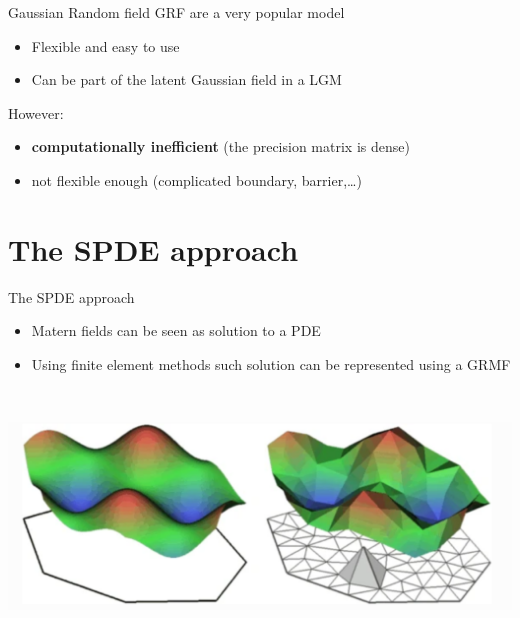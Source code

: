 \documentclass[
  ignorenonframetext,
]{beamer}
\begin{document}
\begin{frame}{Gaussian Random field}
\protect\hypertarget{gaussian-random-field}{}
GRF are a very popular model

\begin{itemize}
\item
  Flexible and easy to use
\item
  Can be part of the latent Gaussian field in a LGM
\end{itemize}

However:

\begin{itemize}
\item
  \textbf{computationally inefficient} (the precision matrix is dense)
\item
  not flexible enough (complicated boundary, barrier,\ldots)
\end{itemize}
\end{frame}

\hypertarget{the-spde-approach}{%
\section{The SPDE approach}\label{the-spde-approach}}

\begin{frame}{The SPDE approach}
\protect\hypertarget{the-spde-approach-1}{}
\begin{itemize}
\item
  Matern fields can be seen as solution to a PDE
\item
  Using finite element methods such solution can be represented using a
  GRMF\\
  \strut \\
\end{itemize}

\begin{center}\includegraphics[width=0.7\linewidth]{graphics/spde} \end{center}
\end{frame}
\end{document}

